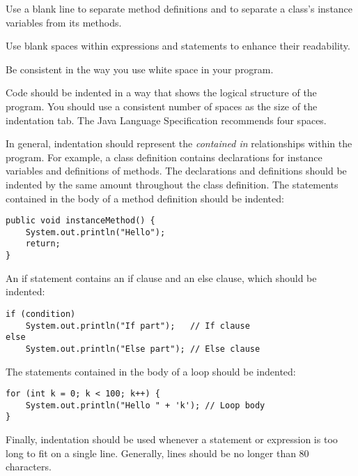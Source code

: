 \begin{BL}
\item  Use a blank line to separate method definitions and to
separate a class's instance variables from its methods.
\item  Use blank spaces within expressions and statements to
enhance their readability.
\item  Be consistent in the way you use white space in your program.
\end{BL}

Code should be indented in a way that shows the logical structure of
the program.  You should use a consistent number of spaces as the size
of the indentation tab.   The Java Language Specification recommends four
spaces.

In general, indentation should represent the {\it contained in}
relationships within the program.  For example, a class definition
contains declarations for instance variables and definitions of
methods.  The declarations and definitions should be indented by the
same amount throughout the class definition.  The statements contained
in the body of a method definition should be indented:

\begin{jjjlisting}
\begin{lstlisting}
public void instanceMethod() {
    System.out.println("Hello");
    return;
}
\end{lstlisting}
\end{jjjlisting}

\noindent An if statement
contains an if clause and an else clause, which should be indented:

\begin{jjjlisting}
\begin{lstlisting}
if (condition)
    System.out.println("If part");   // If clause
else
    System.out.println("Else part"); // Else clause
\end{lstlisting}
\end{jjjlisting}

\noindent The statements contained in the body of a loop should be indented:

\begin{jjjlisting}
\begin{lstlisting}
for (int k = 0; k < 100; k++) {
    System.out.println("Hello " + 'k'); // Loop body
}
\end{lstlisting}
\end{jjjlisting}

Finally, indentation should be used whenever a statement or expression
is too long to fit on a single line.  Generally, lines should be no
longer than 80 characters.

